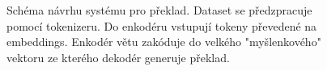 \begin{figure}[H]
    \begin{center}
    \end{center}
	\caption{Schéma návrhu systému pro překlad. Dataset se předzpracuje pomocí tokenizeru. Do enkodéru vstupují tokeny převedené na embeddings. Enkodér větu zakóduje do velkého "myšlenkového" vektoru ze kterého dekodér generuje překlad.}
	\label{img:draft}
\end{figure}



